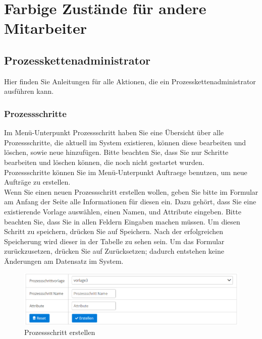 \documentclass[enabledeprecatedfontcommands,fontsize=12pt,paper=a4,twoside]{scrartcl}
\begin{document}
\clearpage
\section{Farbige Zustände für andere Mitarbeiter}
\subsection{Prozesskettenadministrator}

Hier finden Sie Anleitungen für alle Aktionen, die ein Prozesskettenadministrator ausführen kann.
\subsubsection{Prozessschritte}

Im Menü-Unterpunkt Prozessschritt haben Sie eine Übersicht über alle Prozessschritte, die aktuell im System existieren, können diese bearbeiten und löschen, sowie neue hinzufügen. Bitte beachten Sie, dass Sie nur Schritte bearbeiten und löschen können, die noch nicht gestartet wurden. \\

Prozessschritte können Sie im Menü-Unterpunkt Auftraege benutzen, um neue Aufträge zu erstellen. \\

Wenn Sie einen neuen Prozessschritt erstellen wollen, geben Sie bitte im Formular am Anfang der Seite alle Informationen für diesen ein. Dazu gehört, dass Sie eine existierende Vorlage auswählen, einen Namen, und Attribute eingeben. Bitte beachten Sie, dass Sie in allen Feldern Eingaben machen müssen. Um diesen Schritt zu speichern, drücken Sie auf Speichern. Nach der erfolgreichen Speicherung wird dieser in der Tabelle zu sehen sein. Um das Formular zurückzusetzen, drücken Sie auf Zurücksetzen; dadurch entstehen keine Änderungen am Datensatz im System. \\


\begin{figure}[h!]
\begin{center}
 \includegraphics[scale=0.6]{screenshots/pk/prozessschrittform.png}
  \caption{Prozessschritt erstellen}
  \label{fig:boat1}
\end{center}
\end{figure}
\end{document}
